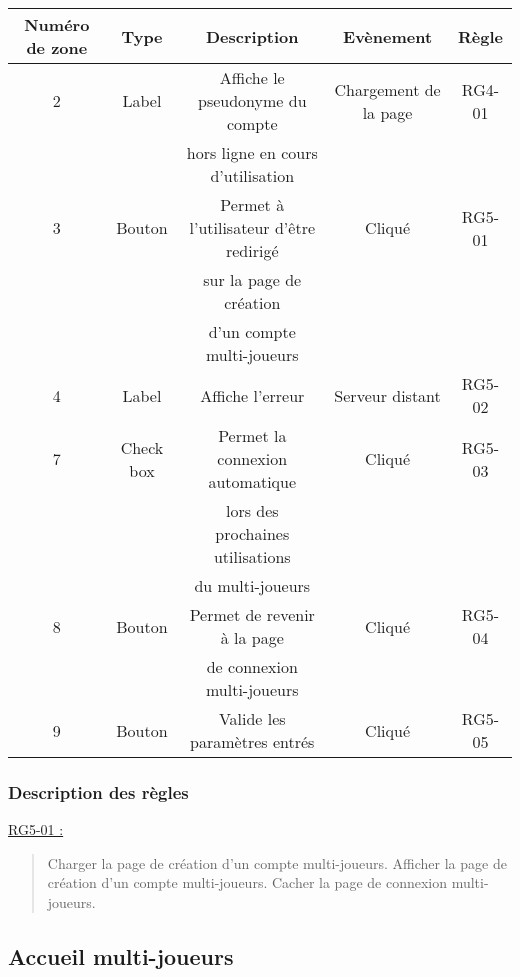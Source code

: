 \documentclass{report}
\begin{document}
			\begin{tabular}{|c|c|c|c|c|} \hline
				Numéro de zone & Type  & Description & Evènement &	Règle \\\hline
				2 & Label & Affiche le pseudonyme du compte & Chargement de la page & RG4-01 \\
				  &       & hors ligne en cours d'utilisation & & \\\hline
				3 & Bouton & Permet à l'utilisateur d'être redirigé & Cliqué & RG5-01\\
				  &        & sur la page de création  & & \\
				  &        & d'un compte multi-joueurs & & \\\hline
				4 & Label & Affiche l'erreur & Serveur distant & RG5-02 \\\hline
				7 & Check box & Permet la connexion automatique & Cliqué & RG5-03 \\
				  &           & lors des prochaines utilisations&        & \\				
				  &           & du multi-joueurs                &        & \\\hline
				8 & Bouton & Permet de revenir à la page & Cliqué & RG5-04 \\
				  &        & de connexion multi-joueurs \footnotemark[1] & & \\\hline
				9 & Bouton & Valide les paramètres entrés & Cliqué & RG5-05 \\\hline
			\end{tabular}
			
		\subsubsection{Description des règles}

			\underline{RG5-01 :}
				\begin{quote}
					Charger la page de création d'un compte multi-joueurs.
					Afficher la page de création d'un compte multi-joueurs.
					Cacher la page de connexion multi-joueurs.
				\end{quote}		

\newpage

	\subsection{Accueil multi-joueurs}

		\hypertarget{Accueil multi-joueurs}{}
		\label{Accueil multi-joueurs}

		\begin{center}
			
		\end{center}
\end{document}
